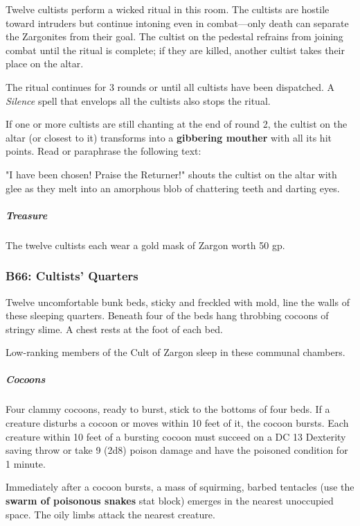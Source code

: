 \documentclass[10pt,a4paper,twoside,bg=print,twocolumn,openany,nodeprecatedcode]{dndbook}
\begin{document}
Twelve cultists perform a wicked ritual in this room. The cultists are hostile toward intruders but continue intoning even in combat—only death can separate the Zargonites from their goal. The cultist on the pedestal refrains from joining combat until the ritual is complete; if they are killed, another cultist takes their place on the altar.

The ritual continues for 3 rounds or until all cultists have been dispatched. A \textit{Silence} spell that envelops all the cultists also stops the ritual.

If one or more cultists are still chanting at the end of round 2, the cultist on the altar (or closest to it) transforms into a \textbf{gibbering mouther} with all its hit points. Read or paraphrase the following text:

\begin{DndReadAloud}{}
"I have been chosen! Praise the Returner!" shouts the cultist on the altar with glee as they melt into an amorphous blob of chattering teeth and darting eyes.

\end{DndReadAloud}

\subparagraph{Treasure}
The twelve cultists each wear a gold mask of Zargon worth 50 gp.

\subsubsection{B66: Cultists' Quarters}
\begin{DndReadAloud}{}
Twelve uncomfortable bunk beds, sticky and freckled with mold, line the walls of these sleeping quarters. Beneath four of the beds hang throbbing cocoons of stringy slime. A chest rests at the foot of each bed.

\end{DndReadAloud}

Low-ranking members of the Cult of Zargon sleep in these communal chambers.

\subparagraph{Cocoons}
Four clammy cocoons, ready to burst, stick to the bottoms of four beds. If a creature disturbs a cocoon or moves within 10 feet of it, the cocoon bursts. Each creature within 10 feet of a bursting cocoon must succeed on a DC 13 Dexterity saving throw or take 9 (2d8) poison damage and have the poisoned condition for 1 minute.

Immediately after a cocoon bursts, a mass of squirming, barbed tentacles (use the \textbf{swarm of poisonous snakes} stat block) emerges in the nearest unoccupied space. The oily limbs attack the nearest creature.
\end{document}
